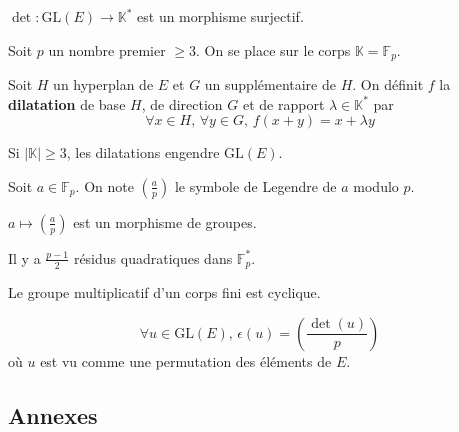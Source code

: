 
	\begin{proposition}
		$\det : \mathrm{GL}(E) \rightarrow \mathbb{K}^*$ est un morphisme surjectif.
	\end{proposition}


	Soit $p$ un nombre premier $\geq 3$. On se place sur le corps $\mathbb{K} = \mathbb{F}_p$.

	\begin{definition}
		Soit $H$ un hyperplan de $E$ et $G$ un supplémentaire de $H$. On définit $f$ la \textbf{dilatation} de base $H$, de direction $G$ et de rapport $\lambda \in \mathbb{K}^*$ par
		\[ \forall x \in H, \, \forall y \in G, \, f(x+y) = x + \lambda y \]
	\end{definition}

	\begin{theorem}
		Si $|\mathbb{K}| \geq 3$, les dilatations engendre $\mathrm{GL}(E)$.
	\end{theorem}

	\begin{notation}
		Soit $a \in \mathbb{F}_p$. On note $\left( \frac{a}{p} \right)$ le symbole de Legendre de $a$ modulo $p$.
	\end{notation}

	\begin{lemma}
		$a \mapsto \left( \frac{a}{p} \right)$ est un morphisme de groupes.
	\end{lemma}

	\begin{lemma}
		Il y a $\frac{p-1}{2}$ résidus quadratiques dans $\mathbb{F}_p^*$.
	\end{lemma}

	\begin{theorem}
		Le groupe multiplicatif d'un corps fini est cyclique.
	\end{theorem}

	\begin{theorem}
		\[ \forall u \in \mathrm{GL}(E), \, \epsilon(u) = \left( \frac{\det(u)}{p} \right) \]
		où $u$ est vu comme une permutation des éléments de $E$.
	\end{theorem}

	\newpage
  \subsection*{Annexes}


